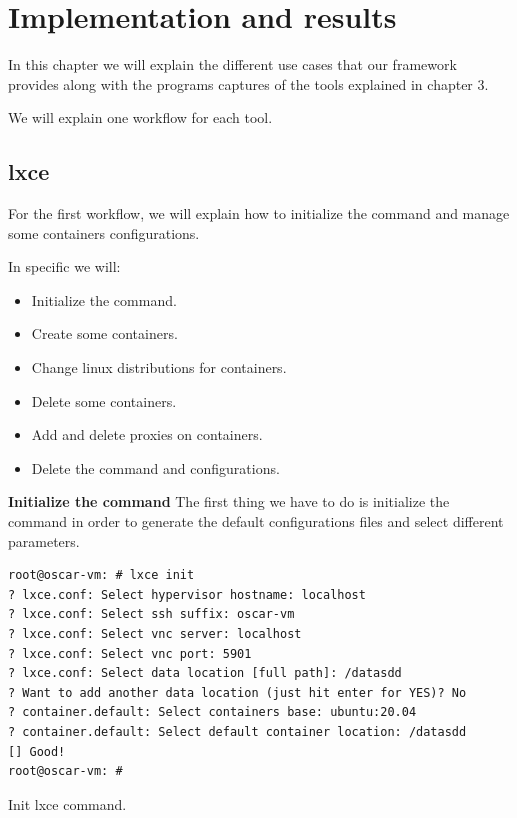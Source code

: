 \clearpage\section{Implementation and results}

In this chapter we will explain the different use cases that our framework provides along with the programs captures of the tools explained in chapter 3.

We will explain one workflow for each tool.

\subsection{lxce}
For the first workflow, we will explain how to initialize the command and manage some containers configurations.

In specific we will:
\begin{itemize}
	\item{Initialize the command.}
	\item{Create some containers.}
	\item{Change linux distributions for containers.}
	\item{Delete some containers.}
	\item{Add and delete proxies on containers.}
	\item{Delete the command and configurations.}
\end{itemize}

\textbf{Initialize the command}
The first thing we have to do is initialize the command in order to generate the default configurations files and select different parameters.

\begin{listing}[H]
\begin{verbatim}
root@oscar-vm: # lxce init
? lxce.conf: Select hypervisor hostname: localhost
? lxce.conf: Select ssh suffix: oscar-vm
? lxce.conf: Select vnc server: localhost
? lxce.conf: Select vnc port: 5901
? lxce.conf: Select data location [full path]: /datasdd
? Want to add another data location (just hit enter for YES)? No
? container.default: Select containers base: ubuntu:20.04
? container.default: Select default container location: /datasdd
[] Good!
root@oscar-vm: #
\end{verbatim}
	\label{fig:Web admin architecture}
	\caption[lxce init]{\footnotesize{Init lxce command.}}
\end{listing}

